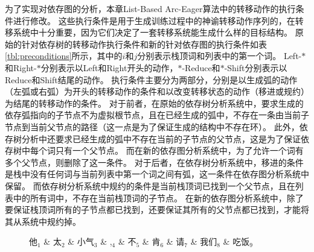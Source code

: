 为了实现对依存图的分析，本章List-Based Arc-Eager算法中的转移动作的执行条件进行修改。
这些执行条件是用于生成训练过程中的神谕转移动作序列的，在转移系统中十分重要，因为它们决定了一套转移系统能生成什么样的目标结构。
原始的针对依存树的转移动作执行条件和新的针对依存图的执行条件如表\ref{tbl:preconditions}所示，其中的$i$和$j$分别表示栈顶词和列表中的第一个词。
Left-$*$和Right-$*$分别表示以Left和Right开头的动作，$*$-Reduce和$*$-Shift分别表示以Reduce和Shift结尾的动作。
执行条件主要分为两部分，分别是以生成弧的动作（左弧或右弧）为开头的转移动作的条件和以改变转移状态的动作（移进或规约）为结尾的转移动作的条件。
对于前者，在原始的依存树分析系统中，要求生成的依存弧指向的子节点不为虚拟根节点，且在已经生成的弧中，不存在一条由当前子节点到当前父节点的路径（这一点是为了保证生成的结构中不存在环）。
此外，依存树分析中还要求已经生成的弧中不存在当前的子节点的父节点，这是为了保证依存树中每个词只有一个父节点。
而在新的依存图分析系统中，为了允许一个词有多个父节点，则删除了这一条件。
对于后者，在依存树分析系统中，移进的条件是栈中没有任何词与当前列表中第一个词之间有弧，这一条件在依存图分析系统中保留。
而依存树分析系统中规约的条件是当前栈顶词已找到一个父节点，且在列表中的所有词中，不存在当前栈顶词的子节点。
在新的依存图分析系统中，除了要保证栈顶词所有的子节点都已找到，还要保证其所有的父节点都已找到，才能将其从系统中规约掉。

\begin{figure}[h]
	\centering
	\begin{dependency}[theme = simple,label style={font=\bfseries,thick}]
		\begin{deptext}[column sep=0.5em]
			他$_1$ \& 太$_2$ \& 小气$_3$ \& ,$_4$ \& 不$_5$ \& 肯$_6$ \& 请$_7$ \& 我们$_8$ \& 吃饭$_9$ \\
		\end{deptext}
	\end{dependency}
\end{figure}


